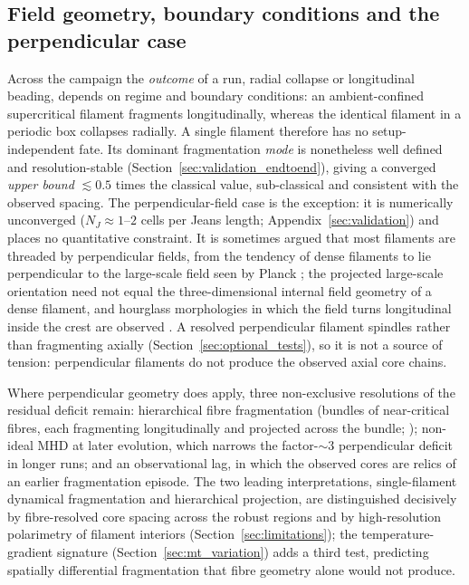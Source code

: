\documentclass[usenatbib,twoside,twocolumn]{mnras}
\begin{document}
\subsection{Field geometry, boundary conditions and the perpendicular case}
\label{sec:why_mhd_fails}

Across the campaign the \emph{outcome} of a run, radial collapse or longitudinal beading, depends on regime and boundary conditions: an ambient-confined supercritical filament fragments longitudinally, whereas the identical filament in a periodic box collapses radially. A single filament therefore has no setup-independent fate. Its dominant fragmentation \emph{mode} is nonetheless well defined and resolution-stable (Section~\ref{sec:validation_endtoend}), giving a converged \emph{upper bound} $\lesssim0.5$ times the classical value, sub-classical and consistent with the observed spacing. The perpendicular-field case is the exception: it is numerically unconverged ($N_J\approx1$--$2$ cells per Jeans length; Appendix~\ref{sec:validation}) and places no quantitative constraint. It is sometimes argued that most filaments are threaded by perpendicular fields, from the tendency of dense filaments to lie perpendicular to the large-scale field seen by Planck \citep{Planck2016}; the projected large-scale orientation need not equal the three-dimensional internal field geometry of a dense filament, and hourglass morphologies in which the field turns longitudinal inside the crest are observed \citep{Jadhav2026}. A resolved perpendicular filament spindles rather than fragmenting axially (Section~\ref{sec:optional_tests}), so it is not a source of tension: perpendicular filaments do not produce the observed axial core chains.

Where perpendicular geometry does apply, three non-exclusive resolutions of the residual deficit remain: hierarchical fibre fragmentation (bundles of near-critical fibres, each fragmenting longitudinally and projected across the bundle; \citealt{Hacar2013,Hacar2018,Yang2024}); non-ideal MHD at later evolution, which narrows the factor-$\sim3$ perpendicular deficit in longer runs; and an observational lag, in which the observed cores are relics of an earlier fragmentation episode. The two leading interpretations, single-filament dynamical fragmentation and hierarchical projection, are distinguished decisively by fibre-resolved core spacing across the robust regions and by high-resolution polarimetry of filament interiors (Section~\ref{sec:limitations}); the temperature-gradient signature (Section~\ref{sec:mt_variation}) adds a third test, predicting spatially differential fragmentation that fibre geometry alone would not produce.
\end{document}
